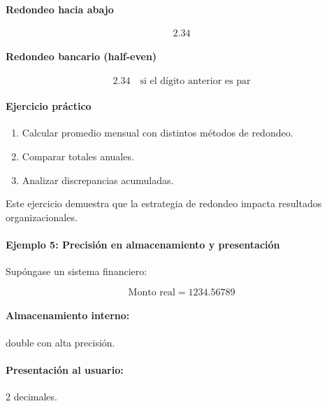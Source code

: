 \documentclass[12pt,twoside]{book}
\begin{document}
						\paragraph{Redondeo hacia abajo}
						
						\[
						2.34
						\]
						
						\paragraph{Redondeo bancario (half-even)}
						
						\[
						2.34 \quad \text{si el dígito anterior es par}
						\]
						
						\paragraph{Ejercicio práctico}
						
						\begin{enumerate}
							\item Calcular promedio mensual con distintos métodos de redondeo.
							\item Comparar totales anuales.
							\item Analizar discrepancias acumuladas.
						\end{enumerate}
						
						\noindent
						Este ejercicio demuestra que la estrategia de redondeo impacta resultados organizacionales.
						
						\paragraph{Ejemplo 5: Precisión en almacenamiento y presentación}
						
						\noindent
						Supóngase un sistema financiero:
						
						\[
						\text{Monto real} = 1234.56789
						\]
						
						\paragraph{Almacenamiento interno:}
						double con alta precisión.
						
						\paragraph{Presentación al usuario:}
						2 decimales.
						
\end{document}
